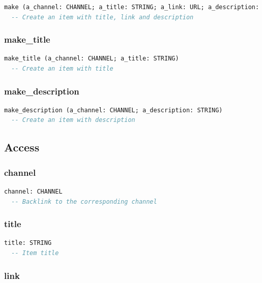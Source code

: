 \begin{lstlisting}[language=Eiffel]
make (a_channel: CHANNEL; a_title: STRING; a_link: URL; a_description: STRING)
  -- Create an item with title, link and description
\end{lstlisting}

\subsubsection{make\_title}

\begin{lstlisting}[language=Eiffel]
make_title (a_channel: CHANNEL; a_title: STRING)
  -- Create an item with title
\end{lstlisting}

\subsubsection{make\_description}

\begin{lstlisting}[language=Eiffel]
make_description (a_channel: CHANNEL; a_description: STRING)
  -- Create an item with description
\end{lstlisting}

\subsection{Access}
\label{sec:item-access}

\subsubsection{channel}

\begin{lstlisting}[language=Eiffel]
channel: CHANNEL
  -- Backlink to the corresponding channel
\end{lstlisting}

\subsubsection{title}

\begin{lstlisting}[language=Eiffel]
title: STRING
  -- Item title
\end{lstlisting}

\subsubsection{link}

